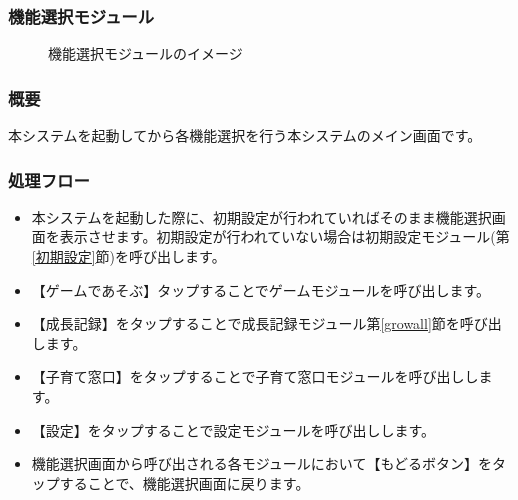 \documentclass[a4j]{jarticle}
\begin{document}
\subsubsection{機能選択モジュール\label{機能選択}}
\begin{figure}[H]
    \begin{center}
    \caption {機能選択モジュールのイメージ}
    \label{functionselection}
    \end{center}
\end{figure}

\subsubsection*{概要}
本システムを起動してから各機能選択を行う本システムのメイン画面です。

\subsubsection*{処理フロー}
\begin{itemize}
\item 本システムを起動した際に、初期設定が行われていればそのまま機能選択画面を表示させます。初期設定が行われていない場合は初期設定モジュール(第\ref{初期設定}節)を呼び出します。

\item 【ゲームであそぶ】タップすることでゲームモジュールを呼び出します。

\item 【成長記録】をタップすることで成長記録モジュール第\ref{growall}節を呼び出します。

\item 【子育て窓口】をタップすることで子育て窓口モジュールを呼び出しします。

\item 【設定】をタップすることで設定モジュールを呼び出しします。

\item 機能選択画面から呼び出される各モジュールにおいて【もどるボタン】をタップすることで、機能選択画面に戻ります。
\end{itemize}
\end{document}
